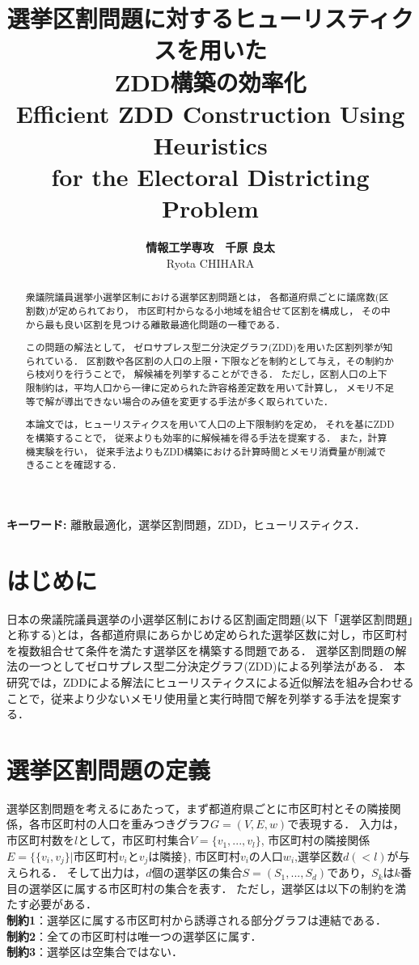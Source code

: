 \documentclass[10pt,a4paper,notitlepage,oneside,twocolumn]{abst_jsarticle}
\title{
{\bf 選挙区割問題に対するヒューリスティクスを用いた\\ZDD構築の効率化}\\
{\sf Efficient ZDD Construction Using Heuristics \\for the Electoral Districting Problem}\\
}
\author{
{\large {\bf 情報工学専攻　千原 良太}}\\
{\large {\sf Ryota CHIHARA}}
}
\date{}
\begin{document}
\maketitle
\thispagestyle{firstpage}

\begin{abstract}
  衆議院議員選挙小選挙区制における選挙区割問題とは，
  各都道府県ごとに議席数(区割数)が定められており，
  市区町村からなる小地域を組合せて区割を構成し，
  その中から最も良い区割を見つける離散最適化問題の一種である．

  この問題の解法として，
  ゼロサプレス型二分決定グラフ(ZDD)を用いた区割列挙が知られている．
  区割数や各区割の人口の上限・下限などを制約として与え，その制約から枝刈りを行うことで，
  解候補を列挙することができる．
  ただし，区割人口の上下限制約は，平均人口から一律に定められた許容格差定数を用いて計算し，
  メモリ不足等で解が導出できない場合のみ値を変更する手法が多く取られていた．

  本論文では，ヒューリスティクスを用いて人口の上下限制約を定め，
  それを基にZDDを構築することで，
  従来よりも効率的に解候補を得る手法を提案する．
  また，計算機実験を行い，
  従来手法よりもZDD構築における計算時間とメモリ消費量が削減できることを確認する．
\end{abstract}


\vspace{1zw} \noindent
{\bf キーワード:} 
離散最適化，選挙区割問題，ZDD，ヒューリスティクス．


\section{はじめに} \label{sec:section1}
日本の衆議院議員選挙の小選挙区制における区割画定問題(以下「選挙区割問題」と称する)とは，各都道府県にあらかじめ定められた選挙区数に対し，市区町村を複数組合せて条件を満たす選挙区を構築する問題である．
選挙区割問題の解法の一つとしてゼロサプレス型二分決定グラフ(ZDD)による列挙法\cite{kawahara}がある．
本研究では，ZDDによる解法にヒューリスティクスによる近似解法を組み合わせることで，従来より少ないメモリ使用量と実行時間で解を列挙する手法を提案する．

\section{選挙区割問題の定義} \label{sec:section2}
選挙区割問題を考えるにあたって，まず都道府県ごとに市区町村とその隣接関係，各市区町村の人口を重みつきグラフ$G=(V,E,w)$で表現する．
入力は，市区町村数を$l$として，市区町村集合$V=\{v_1,...,v_l\}$, 市区町村の隣接関係$E=\{\{v_i,v_j\}|$市区町村$v_i$と$v_j$は隣接$\}$, 市区町村$v_i$の人口$w_i$,選挙区数$d(<l)$が与えられる．
そして出力は，$d$個の選挙区の集合$S=(S_1,...,S_d)$であり，$S_k$は$k$番目の選挙区に属する市区町村の集合を表す．
ただし，選挙区は以下の制約を満たす必要がある．\\
\textbf{制約1}：選挙区に属する市区町村から誘導される部分グラフは連結である．\\
\textbf{制約2}：全ての市区町村は唯一つの選挙区に属す．\\
\textbf{制約3}：選挙区は空集合ではない．
\end{document}
